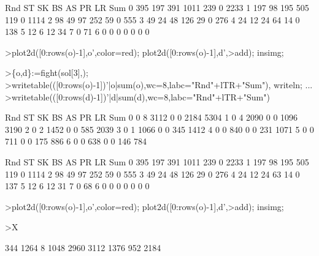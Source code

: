 \documentclass[a4paper,10pt]{article}
\begin{document}
\begin{eulernotebook}
\begin{euleroutput}
       Rnd      ST      SK      BS      AS      PR      LR     Sum
         0     395     197     391    1011     239       0    2233
         1     197      98     195     505     119       0    1114
         2      98      49      97     252      59       0     555
         3      49      24      48     126      29       0     276
         4      24      12      24      64      14       0     138
         5      12       6      12      34       7       0      71
         6       0       0       0       0       0       0       0
\end{euleroutput}
\begin{eulerprompt}
>plot2d([0:rows(o)-1],o',color=red); plot2d([0:rows(o)-1],d',>add); insimg;
\end{eulerprompt}
\begin{eulerprompt}
>\{o,d\}:=fight(sol[3],);
>writetable(([0:rows(o)-1])'|o|sum(o),wc=8,labc="Rnd"+lTR+"Sum"), writeln; ...
>writetable(([0:rows(d)-1])'|d|sum(d),wc=8,labc="Rnd"+lTR+"Sum")
\end{eulerprompt}
\begin{euleroutput}
       Rnd      ST      SK      BS      AS      PR      LR     Sum
         0       0       8    3112       0       0    2184    5304
         1       0       4    2090       0       0    1096    3190
         2       0       2    1452       0       0     585    2039
         3       0       1    1066       0       0     345    1412
         4       0       0     840       0       0     231    1071
         5       0       0     711       0       0     175     886
         6       0       0     638       0       0     146     784
  
       Rnd      ST      SK      BS      AS      PR      LR     Sum
         0     395     197     391    1011     239       0    2233
         1     197      98     195     505     119       0    1114
         2      98      49      97     252      59       0     555
         3      49      24      48     126      29       0     276
         4      24      12      24      63      14       0     137
         5      12       6      12      31       7       0      68
         6       0       0       0       0       0       0       0
\end{euleroutput}
\begin{eulerprompt}
>plot2d([0:rows(o)-1],o',color=red); plot2d([0:rows(o)-1],d',>add); insimg;
\end{eulerprompt}
\begin{eulerprompt}
>X
\end{eulerprompt}
\begin{euleroutput}
      344    1264       8 
     1048    2960    3112 
     1376     952    2184 
\end{euleroutput}
\end{eulernotebook}
\end{document}

